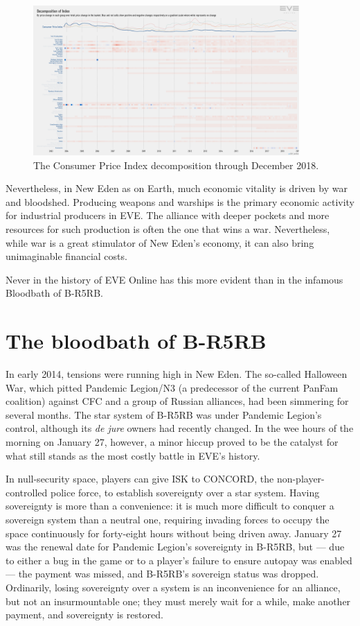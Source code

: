 \documentclass[letterpaper,12pt,article]{memoir}
\begin{document}
\begin{figure}[ht]
    \centering
    \includegraphics[width=4in]{9ea_index-decomp-ConsumerPriceIndex.png}
    \caption{The Consumer Price Index decomposition through December 2018.
    \cite{MERdec2018}}
    \label{fig:cpi}
\end{figure}

Nevertheless, in New Eden as on Earth, much economic vitality is driven by war 
and bloodshed. Producing weapons and warships is the primary economic activity
for industrial producers in EVE. The alliance with deeper pockets and more 
resources for such production is often the one that wins a war. Nevertheless,
while war is a great stimulator of New Eden's economy, it can also bring
unimaginable financial costs. 

Never in the history of EVE Online has this more evident than in the infamous
Bloodbath of B-R5RB.

\section{The bloodbath of B-R5RB}
\label{subsec:bloodbath}

In early 2014, tensions were running high in New Eden. The so-called
Halloween War, which pitted Pandemic Legion/N3 (a predecessor of the current
PanFam coalition) against CFC and a group of Russian alliances, had been 
simmering for several months. The star system of B-R5RB was under Pandemic
Legion's control, although its \textit{de jure} owners had recently changed.
In the wee hours of the morning on January 27, however, a minor hiccup proved
to be the catalyst for what still stands as the most costly battle in EVE's
history.

In null-security space, players can give ISK to CONCORD, the 
non-player-controlled police force, to establish sovereignty over a star system. 
Having sovereignty is more than a convenience: it is much more difficult to 
conquer a sovereign system than a neutral one, requiring invading forces to occupy
the space continuously for forty-eight hours without being driven away. January
27 was the renewal date for Pandemic Legion's sovereignty in B-R5RB, but ---
due to either a bug in the game or to a player's failure to ensure autopay was
enabled --- the payment was missed, and B-R5RB's sovereign status was dropped.
Ordinarily, losing sovereignty over a system is an inconvenience for an 
alliance, but not an insurmountable one; they must merely wait for a while,
make another payment, and sovereignty is restored. 
\end{document}
